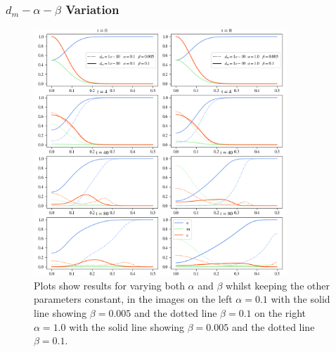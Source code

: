 \subsubsection*{$d_m - \alpha - \beta$ Variation}
\begin{figure}[h]
    \centering
    \includegraphics[width=0.85\textwidth]{resources/images/dm_alpha_beta_variation_1.png}
    \caption{Plots show results for varying both $\alpha$ and $\beta$ whilst keeping the other parameters constant, in the images on the left $\alpha=0.1$ with the solid line showing $\beta = 0.005$ and the dotted line $\beta=0.1$ on the right $\alpha=1.0$ with the solid line showing $\beta = 0.005$ and the dotted line $\beta=0.1$.}
    \label{fig:dm_alpha_beta_variation_1}
\end{figure}
